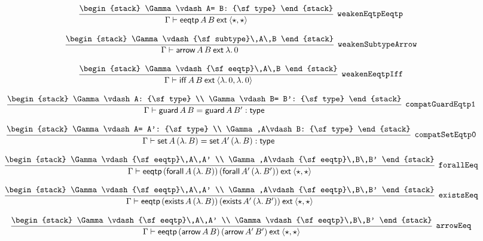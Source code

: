 \[
\infer[{\tt weakenEqtpEeqtp}]{\Gamma \vdash {\sf eeqtp}\,A\,B\:{\sf ext}\:\langle \star ,\star \rangle }{
\begin{stack}
\Gamma \vdash A= B: {\sf type}
\end{stack}}
\]

\[
\infer[{\tt weakenSubtypeArrow}]{\Gamma \vdash {\sf arrow}\,A\,B\:{\sf ext}\:\lambda .\,0}{
\begin{stack}
\Gamma \vdash {\sf subtype}\,A\,B
\end{stack}}
\]

\[
\infer[{\tt weakenEeqtpIff}]{\Gamma \vdash {\sf iff}\,A\,B\:{\sf ext}\:\langle \lambda .\,0,\lambda .\,0\rangle }{
\begin{stack}
\Gamma \vdash {\sf eeqtp}\,A\,B
\end{stack}}
\]

\[
\infer[{\tt compatGuardEqtp1}]{\Gamma \vdash {\sf guard}\,A\,B= {\sf guard}\,A\,B': {\sf type}}{
\begin{stack}
\Gamma \vdash A: {\sf type}
\\
\Gamma \vdash B= B': {\sf type}
\end{stack}}
\]

\[
\infer[{\tt compatSetEqtp0}]{\Gamma \vdash {\sf set}\,A\,(\lambda .\,B)= {\sf set}\,A'\,(\lambda .\,B): {\sf type}}{
\begin{stack}
\Gamma \vdash A= A': {\sf type}
\\
\Gamma ,A\vdash B: {\sf type}
\end{stack}}
\]

\[
\infer[{\tt forallEeq}]{\Gamma \vdash {\sf eeqtp}\,({\sf forall}\,A\,(\lambda .\,B))\,({\sf forall}\,A'\,(\lambda .\,B'))\:{\sf ext}\:\langle \star ,\star \rangle }{
\begin{stack}
\Gamma \vdash {\sf eeqtp}\,A\,A'
\\
\Gamma ,A\vdash {\sf eeqtp}\,B\,B'
\end{stack}}
\]

\[
\infer[{\tt existsEeq}]{\Gamma \vdash {\sf eeqtp}\,({\sf exists}\,A\,(\lambda .\,B))\,({\sf exists}\,A'\,(\lambda .\,B'))\:{\sf ext}\:\langle \star ,\star \rangle }{
\begin{stack}
\Gamma \vdash {\sf eeqtp}\,A\,A'
\\
\Gamma ,A\vdash {\sf eeqtp}\,B\,B'
\end{stack}}
\]

\[
\infer[{\tt arrowEeq}]{\Gamma \vdash {\sf eeqtp}\,({\sf arrow}\,A\,B)\,({\sf arrow}\,A'\,B')\:{\sf ext}\:\langle \star ,\star \rangle }{
\begin{stack}
\Gamma \vdash {\sf eeqtp}\,A\,A'
\\
\Gamma \vdash {\sf eeqtp}\,B\,B'
\end{stack}}
\]

